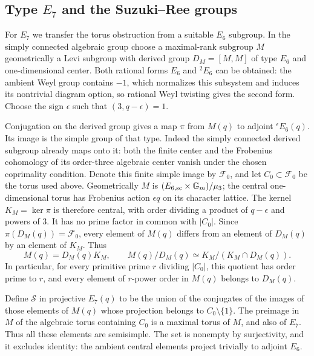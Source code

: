 \subsection{Type \texorpdfstring{$E_7$}{E7} and the Suzuki--Ree groups}

For $E_7$ we transfer the torus obstruction from a suitable $E_6$
subgroup. In the simply connected algebraic group choose a
maximal-rank subgroup $M$ geometrically a Levi subgroup with
derived group $D_M=[M,M]$ of type $E_6$ and one-dimensional center. Both
rational forms $E_6$ and ${}^2E_6$ can be obtained: the ambient
Weyl group contains $-1$, which normalizes this subsystem and
induces its nontrivial diagram option, so rational Weyl twisting
gives the second form. Choose the sign $\epsilon$ such that
$(3,q-\epsilon)=1$.

Conjugation on the derived group gives a map $\pi$ from $M(q)$ to
adjoint ${}^{\epsilon}E_6(q)$. Its image is the simple group of
that type. Indeed the simply connected derived subgroup already
maps onto it: both the finite center and the Frobenius cohomology
of its order-three algebraic center vanish under the chosen
coprimality condition. Denote this finite simple image by
$\mathcal F_0$, and let $C_0\subset\mathcal F_0$ be the torus used
above. Geometrically $M$ is $(E_{6,\mathrm{sc}}\times\mathbb G_m)/\mu_3$;
the central one-dimensional torus has Frobenius action $\epsilon q$
on its character lattice. The kernel $K_M=\ker\pi$ is therefore
central, with order dividing a product of $q-\epsilon$ and powers of $3$. It has no
prime factor in common with $|C_0|$.
Since $\pi(D_M(q))=\mathcal F_0$, every element of $M(q)$ differs
from an element of $D_M(q)$ by an element of $K_M$. Thus
\[
 M(q)=D_M(q)K_M,\qquad
 M(q)/D_M(q)\simeq K_M/(K_M\cap D_M(q)).
\]
In particular, for every primitive prime $r$ dividing $|C_0|$,
this quotient has order prime to $r$, and every element of
$r$-power order in $M(q)$ belongs to $D_M(q)$.

Define $\mathcal S$ in projective $E_7(q)$ to be the union of the
conjugates of the images of those elements of $M(q)$ whose
projection belongs to $C_0\setminus\{1\}$. The preimage in $M$
of the algebraic torus containing $C_0$ is a maximal torus of
$M$, and also of $E_7$. Thus all these elements are semisimple.
The set is nonempty by surjectivity, and it excludes identity:
the ambient central elements project trivially to adjoint $E_6$.

